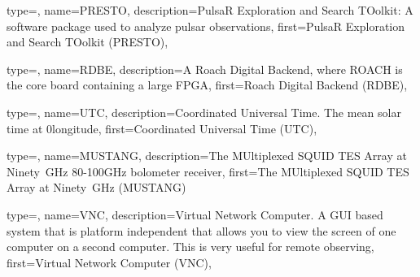{
  type=\acronymtype,
  name={PRESTO},
  description={PulsaR Exploration and Search TOolkit: A software package used
               to analyze pulsar observations},
  first={PulsaR Exploration and Search TOolkit (PRESTO)},
} 


{
  type=\acronymtype,
  name={RDBE},
  description={A Roach Digital Backend, where ROACH is the core board
containing a large FPGA},
  first={Roach Digital Backend (RDBE)},
} 

{
  type=\acronymtype,
  name={UTC},
  description={Coordinated Universal Time.
               The mean solar time at 0\degree longitude},
  first={Coordinated Universal Time (UTC)},
} 


{
  type=\acronymtype,
  name={MUSTANG},
  description={The MUltiplexed SQUID TES Array at Ninety~GHz
               80-100GHz bolometer receiver},
  first={The MUltiplexed SQUID TES Array at Ninety~GHz (MUSTANG)}
} 

{
  type=\acronymtype,
  name={VNC},
  description={Virtual Network Computer.
A GUI based system that is platform independent that allows
you to view the screen of one computer on a second computer.  This is very
useful for remote observing},
  first={Virtual Network Computer (VNC)},
}










